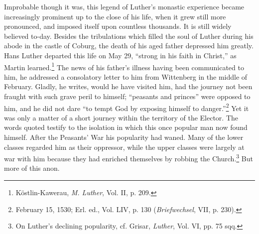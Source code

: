 Improbable though it was, this legend of Luther’s monastic experience
became increasingly prominent up to the close of his life,
when it grew still more pronounced, and imposed itself upon countless
thousands. It is still widely believed to-day.
Besides the tribulations which filled the soul of Luther during his
abode in the castle of Coburg, the death of his aged father depressed
him greatly. Hans Luther departed this life on May 29, “strong in
his faith in Christ,” as Martin learned.\footnote{Köstlin-Kawerau, \textit{M. Luther}, Vol. II, p. 209.}
 The news of his father’s
illness having been communicated to him, he addressed a consolatory
letter to him from Wittenberg in the middle of February. Gladly, he
writes, would he have visited him, had the journey not been fraught
with such grave peril to himself; “peasants and princes” were opposed
to him, and he did not dare “to tempt God by exposing himself to
danger.”\footnote{February 15, 1530; Erl. ed., Vol. LIV, p. 130 (\textit{Briefwechsel}, VII, p. 230).}
 Yet it was only a matter of a short journey within the
territory of the Elector. The words quoted testify to the isolation in
which this once popular man now found himself. After the Peasants’
War his popularity had waned. Many of the lower classes regarded
him as their oppressor, while the upper classes were largely at war
with him because they had enriched themselves by robbing the
Church.\footnote{On Luther’s declining popularity, cf. Grisar, \textit{Luther}, Vol. VI, pp. 75 sqq.}
But more of this anon.
